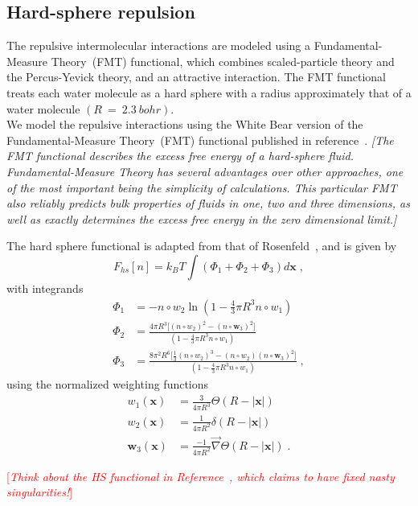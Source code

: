 \documentclass[letterpaper,twocolumn,amsmath,amssymb,prb]{revtex4}
\newcommand{\xx}{\textbf{x}}
\newcommand{\needsworklater}[1]{\emph{[#1]}}
\newcommand{\needsworknow}[1]{\textcolor{red}{[\emph{#1}]}}
\begin{document}
\subsection{Hard-sphere repulsion}
The repulsive intermolecular interactions are modeled using a
Fundamental\nobreakdash-Measure Theory~\cite{rosenfeld1997}(FMT) functional,
which combines scaled-particle theory and the Percus-Yevick theory,
and an attractive interaction.  The FMT functional treats
each water molecule as a hard sphere with a radius approximately that of
a water molecule $(R~=~2.3~bohr)$.\\


We model the repulsive interactions using the White Bear version of
the Fundamental-Measure Theory~(FMT) functional published in
reference~\cite{roth2002whitebear}.  \needsworklater{The FMT
  functional describes the excess free energy of a hard-sphere
  fluid. Fundamental-Measure Theory has several advantages over other
  approaches, one of the most important being the simplicity of
  calculations.  This particular FMT also reliably predicts bulk
  properties of fluids in one, two and three dimensions, as well as
  exactly determines the excess free energy in the zero dimensional
  limit.}

The hard sphere functional is adapted from that of
Rosenfeld~\cite{rosenfeld1997},
and is given by
\begin{equation}
F_{hs}[n] = k_B T \int (\Phi_1 + \Phi_2 + \Phi_3) d\xx \; ,
\end{equation}
with integrands
\begin{align}
\Phi_1 &= -n\circ w_2 \ln\left( 1-\frac{4}{3}\pi R^3 n\circ w_1\right)\\
\Phi_2 &= \frac{4\pi R^3 \lbrack (n\circ w_2)^2 - (n\circ \mathbf{w}_3)^2\rbrack}
          {\left( 1-\frac{4}{3}\pi R^3 n\circ w_1\right)}\\
\Phi_3 &= \frac{8\pi^2 R^6\lbrack \frac{1}{3}(n\circ w_2)^3 - (n\circ
          w_2)(n\circ \mathbf{w}_3)^2\rbrack}
          {\left( 1-\frac{4}{3}\pi R^3 n\circ w_1\right)} \; ,
\end{align}
using the normalized weighting functions 
\begin{align}
w_1(\xx) &= \frac{3}{4\pi R^3}\Theta(R-|\xx|)\\
w_2(\xx) &= \frac{1}{4\pi R^2}\delta(R-|\xx|)\\
\mathbf{w}_3(\xx) &= \frac{-1}{4\pi R^2}\vec{\nabla}\Theta(R-|\xx|) \; .
\end{align}

\needsworknow{Think about the HS functional in
  Reference~\cite{tarazona2000}, which claims to have fixed nasty
  singularities!}
\end{document}
